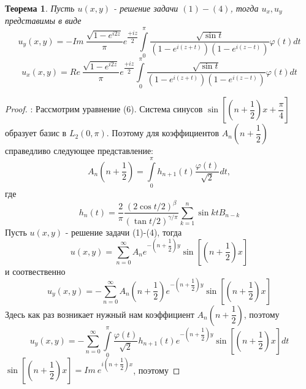 \documentclass[a4paper, 9pt]{article}
\newtheorem{theorem}{Теорема}
\begin{document}
	\begin{theorem}
		Пусть $u(x,y)$ - решение задачи $(1)-(4)$, тогда $u_x, u_y$ представимы в виде
		\begin{equation}
			u_y(x,y) = - Im\  \dfrac{ \sqrt{1 - e^{i2z}} }{\pi} e^{\dfrac{+iz}{2}} \int\limits_0^\pi  \dfrac{\sqrt{\sin{t}}}{\left(1 - e^{i(z+t)} \right) \left(1 - e^{i(z-t)}\right)}  \varphi(t) dt
		\end{equation}
		\begin{equation}
			u_x(x,y) = Re\   \dfrac{ \sqrt{1 - e^{i2z}} }{\pi} e^{\dfrac{+iz}{2}} \int\limits_0^\pi  \dfrac{\sqrt{\sin{t}}}{\left(1 - e^{i(z+t)} \right) \left(1 - e^{i(z-t)}\right)}  \varphi(t) dt
		\end{equation}
	\end{theorem}
		\begin{proof}:
		\newline
		Рассмотрим уравнение (6). Система синусов $\sin{\left[\left(n +\dfrac12\right)x + \dfrac\pi4\right]}$ образует базис в $L_2(0,\pi)$. Поэтому для коэффициентов $A_n\left(n+\dfrac12\right)$ справедливо следующее представление:
		\begin{equation*}
			A_n\left(n+\dfrac12\right) = \int\limits_0^\pi h_{n+1}(t) \dfrac{\varphi(t)}{\sqrt2} dt, 
		\end{equation*}
		где
		\begin{equation*}
			h_n(t) = \dfrac{2}{\pi}\dfrac{(2\cos{t/2})^\beta}{(\tan{t/2})^{\gamma/\pi}} \sum\limits_{k=1}^n \sin{kt} B_{n-k}
		\end{equation*}
		Пусть $u(x,y)$ - решение задачи (1)-(4), тогда
		\begin{equation*}
			u(x,y) = \sum\limits_{n=0}^{\infty} A_n e^{-\left(n + \dfrac12\right)y} \sin{\left[\left(n + \dfrac12\right)x\right]}
		\end{equation*}
		и соотвественно
		\begin{equation*}
			u_y(x,y) = -\sum\limits_{n=0}^{\infty} A_n \left(n +\dfrac12\right) e^{-\left(n + \dfrac12\right)y} \sin{\left[\left(n + \dfrac12\right)x\right]}
		\end{equation*}
		Здесь как раз возникает нужный нам коэффициент $A_n \left(n+\dfrac12\right)$, поэтому
		\begin{equation*}
			u_y(x,y)  = - \sum\limits_{n=0}^{\infty}  \int\limits_0^\pi \dfrac{\varphi(t)}{\sqrt2}  h_{n+1}(t)  e^{-\left(n + \dfrac12\right)y} \sin{\left[\left(n + \dfrac12\right)x\right]} dt
		\end{equation*}
		$\sin{\left[\left(n + \dfrac12\right)x\right]} = Im \ e^{i\left(n + \dfrac12\right)x}$, поэтому

\end{proof}
\end{document}
